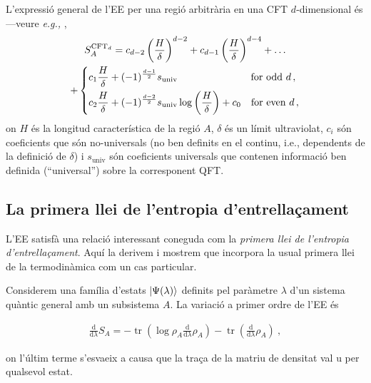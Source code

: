 \documentclass[twocolumn]{revtex4}
\providecommand{\eqgat}[2]{
    \begin{gather}
        #2
    \label{eq:#1}
    \end{gather}
}
\DeclareMathOperator{\tr}{tr}
\begin{document}
L'expressió general de l'EE per una regió arbitrària en una CFT $d$-dimensional és ---veure {\emph{e.g.,}} \cite{nishioka_entanglement_2018},
\begin{gather}
    S_A^{\text{CFT}_d} = c_{d-2} \left( \frac{H}{\delta} \right) ^{d-2} + c_{d-1} \left( \frac{H}{\delta} \right) ^{d-4} + \dots \label{eq:EE_CFT} \\
    + \begin{dcases}
        c_1 \frac{H}{\delta} + (-1)^{\frac{d-1}{2}} s_{\text{univ}}
        \qquad \qquad \qquad \quad \ \text{for odd } d \, , \\
        c_2  \frac{H}{\delta} + (-1)^{\frac{d-2}{2}} s_{\text{univ}} \log \left ( \frac{H}{\delta} \right ) + c_0
        \quad \text{for even } d \, ,
    \end{dcases} \nonumber
\end{gather}
on $H$ és la longitud característica de la regió $A$, $\delta$ és un límit ultraviolat, $c_i$ són coeficients que són no-universals (no ben definits en el continu, i.e., dependents de la definició de $\delta$) i $s_{\text{univ}}$ són coeficients universals que contenen informació ben definida (``universal'') sobre la corresponent QFT.


\subsection{La primera llei de l'entropia d'entrellaçament}

L'EE satisfà una relació interessant coneguda com la \emph{primera llei de l'entropia d'entrellaçament}.
Aquí la derivem i mostrem que incorpora la usual primera llei de la termodinàmica com un cas particular.

Considerem una família d'estats $\ket{\Psi(\lambda)}$ definits pel paràmetre $\lambda$ d'un sistema quàntic general amb un subsistema $A$. La variació a primer ordre de l'EE és \cite{van_raamsdonk_lectures_2017}
\eqgat{varEE}{
\frac{\mathrm{d}}{\mathrm{d} \lambda} S_A = - \tr \left( \log \rho_A \frac{\mathrm{d}}{\mathrm{d} \lambda} \rho_A \right) - \tr \left( \frac{\mathrm{d}}{\mathrm{d} \lambda} \rho_A \right) \ ,
}
on l'últim terme s'esvaeix a causa que la traça de la matriu de densitat val u per qualsevol estat.
\end{document}
